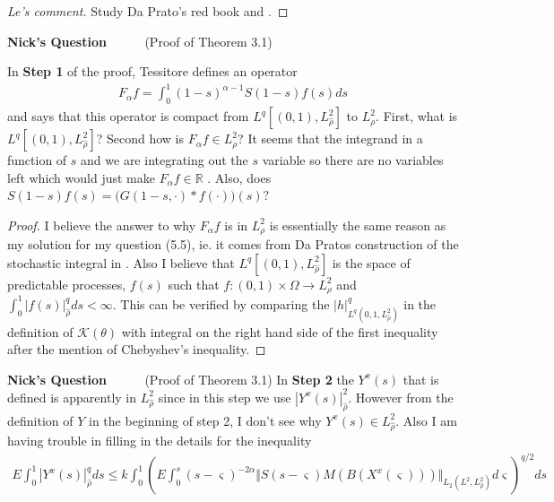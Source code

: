 \documentclass[a4paper,11pt]{article}
\theoremstyle{plain}
\theoremstyle{definition}
\newcounter{NQ}
\newenvironment{NickQuestion}[1][] %
  {\refstepcounter{NQ}
  \begin{mdframed}[backgroundcolor=lightgray]\textbf{Nick's Question \theNQ \: #1~~}~~~\noindent}%
  {\end{mdframed}}
\numberwithin{NQ}{section}
\numberwithin{LQ}{section}
\numberwithin{ZQ}{section}
\begin{document}
 \begin{proof}[Le's comment]
 Study Da Prato's red book \cite{DZ92} and \cite{DalangQuer}. 
 \end{proof} 
  
  \newpage
     \begin{NickQuestion}(Proof of Theorem 3.1)
      
     In \textbf{Step 1} of the proof, Tessitore defines an operator \begin{align}F_\alpha f = \int_0^1(1-s)^{\alpha-1}S(1-s)f(s)ds \end{align} and says that this operator is compact from $L^q[(0,1),L^2_{\hat\rho} ]$ to $L^2_\rho$. First, what is $L^q[(0,1),L^2_{\hat\rho} ]$? Second how is $F_\alpha f \in L^2_\rho$? It seems that the integrand in a function of $s$ and we are integrating out the $s$ variable so there are no variables left which would just make $F_\alpha f \in \mathbb R$ . Also, does $S(1-s)f(s)=\big(G(1-s,\cdot)*f(\cdot)\big)(s)?$ 
     \end{NickQuestion}
     \begin{proof}
I believe the answer to why $F_\alpha f$ is in $L^2_\rho$ is essentially the same reason as my solution for my question (5.5), ie. it comes from Da Pratos construction of the stochastic integral in \cite{PZ95}. Also I believe that $L^q[(0,1),L^2_{\hat\rho} ]$ is the space of predictable processes, $f(s)$ such that $f:(0,1)\times \Omega \to L^2_\rho$ and $\int_0^1|f(s)|^q_{\hat \rho}ds < \infty $. This can be verified by comparing the $|h|^q_{L^q(0,1,L^2_{\hat\rho})}$ in the definition of $\mathscr K (\theta)$ with integral on the right hand side of the first inequality after the mention of Chebyshev's inequality. 
\end{proof}

     \begin{NickQuestion}(Proof of Theorem 3.1)
       In \textbf{Step 2} the $Y^x(s)$ that is defined is apparently in $L^2_{\hat\rho}$ since in this step we use $|Y^x(s)|_{\hat\rho}^2$. However from the definition of $Y$ in the beginning of step 2, I don't see why $Y^x(s) \in L^2_{\hat\rho}$. Also I am having trouble in filling in the details for the inequality \begin{align}
         E\int_0^1|Y^x(s)|^q_{\hat\rho} ds \le k\int_0^1\left( E\int_0^s(s-\varsigma)^{-2\alpha}\Vert S(s-\varsigma)M(B(X^x(\varsigma))) \Vert _{L_2(L^2,L^2_{\hat\rho})}d\varsigma \right)^{q/2}ds
     \end{align}
\end{NickQuestion}
\end{document}
